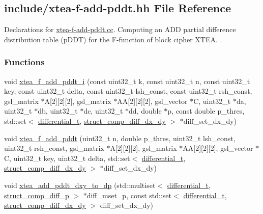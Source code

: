\hypertarget{xtea-f-add-pddt_8hh}{\subsection{include/xtea-\/f-\/add-\/pddt.hh \-File \-Reference}
\label{xtea-f-add-pddt_8hh}
}


\-Declarations for \hyperlink{xtea-f-add-pddt_8cc}{xtea-\/f-\/add-\/pddt.\-cc}. \-Computing an \-A\-D\-D partial difference distribution table (p\-D\-D\-T) for the \-F-\/function of block cipher \-X\-T\-E\-A. .  


\subsubsection*{\-Functions}
\begin{DoxyCompactItemize}
\item 
void \hyperlink{xtea-f-add-pddt_8hh_a6dded7b175a5f072d48becf43f3c9db1}{xtea\-\_\-f\-\_\-add\-\_\-pddt\-\_\-i} (const uint32\-\_\-t k, const uint32\-\_\-t n, const uint32\-\_\-t key, const uint32\-\_\-t delta, const uint32\-\_\-t lsh\-\_\-const, const uint32\-\_\-t rsh\-\_\-const, gsl\-\_\-matrix $\ast$\-A\mbox{[}2\mbox{]}\mbox{[}2\mbox{]}\mbox{[}2\mbox{]}, gsl\-\_\-matrix $\ast$\-A\-A\mbox{[}2\mbox{]}\mbox{[}2\mbox{]}\mbox{[}2\mbox{]}, gsl\-\_\-vector $\ast$\-C, uint32\-\_\-t $\ast$da, uint32\-\_\-t $\ast$db, uint32\-\_\-t $\ast$dc, uint32\-\_\-t $\ast$dd, double $\ast$p, const double p\-\_\-thres, std\-::set$<$ \hyperlink{structdifferential__t}{differential\-\_\-t}, \hyperlink{structstruct__comp__diff__dx__dy}{struct\-\_\-comp\-\_\-diff\-\_\-dx\-\_\-dy} $>$ $\ast$diff\-\_\-set\-\_\-dx\-\_\-dy)
\item 
void \hyperlink{xtea-f-add-pddt_8hh_a98d696f2047ccb8b1a07f777a55a1168}{xtea\-\_\-f\-\_\-add\-\_\-pddt} (uint32\-\_\-t n, double p\-\_\-thres, uint32\-\_\-t lsh\-\_\-const, uint32\-\_\-t rsh\-\_\-const, gsl\-\_\-matrix $\ast$\-A\mbox{[}2\mbox{]}\mbox{[}2\mbox{]}\mbox{[}2\mbox{]}, gsl\-\_\-matrix $\ast$\-A\-A\mbox{[}2\mbox{]}\mbox{[}2\mbox{]}\mbox{[}2\mbox{]}, gsl\-\_\-vector $\ast$\-C, uint32\-\_\-t key, uint32\-\_\-t delta, std\-::set$<$ \hyperlink{structdifferential__t}{differential\-\_\-t}, \hyperlink{structstruct__comp__diff__dx__dy}{struct\-\_\-comp\-\_\-diff\-\_\-dx\-\_\-dy} $>$ $\ast$diff\-\_\-set\-\_\-dx\-\_\-dy)
\item 
void \hyperlink{xtea-f-add-pddt_8hh_a84e14ae4c2be82a4895dfa91f012e9e3}{xtea\-\_\-add\-\_\-pddt\-\_\-dxy\-\_\-to\-\_\-dp} (std\-::multiset$<$ \hyperlink{structdifferential__t}{differential\-\_\-t}, \hyperlink{structstruct__comp__diff__p}{struct\-\_\-comp\-\_\-diff\-\_\-p} $>$ $\ast$diff\-\_\-mset\-\_\-p, const std\-::set$<$ \hyperlink{structdifferential__t}{differential\-\_\-t}, \hyperlink{structstruct__comp__diff__dx__dy}{struct\-\_\-comp\-\_\-diff\-\_\-dx\-\_\-dy} $>$ diff\-\_\-set\-\_\-dx\-\_\-dy)
\end{DoxyCompactItemize}


